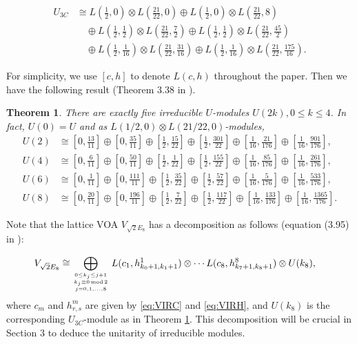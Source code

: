 \documentclass{article}
\newtheorem{theorem}[lemma]{Theorem}
\begin{document}
	\[
	\begin{split}
		U_{3C}
		& \cong  L(\frac{1}2,0)\otimes L(\frac{21}{22},0)
		\oplus L(\frac{1}{2},0)\otimes L(\frac{21}{22},8)
		\\
		& \quad \oplus  L(\frac{1}2,\frac{1}2)\otimes L(\frac{21}{22},\frac{7}{2})
		\oplus L(\frac{1}2,\frac{1}2)\otimes L(\frac{21}{22},\frac{45}{2})
		\\
		& \quad  \oplus L(\frac{1}{2},\frac{1}{16})\otimes L(\frac{21}{22},\frac{31}{16})
		\oplus L(\frac{1}{2},\frac{1}{16})\otimes L(\frac{21}{22},\frac{175}{16}).
	\end{split}
	\]
	
	For simplicity, we use $[c, h]$ to denote $L(c, h)$ throughout the paper. Then we have the following result (Theorem 3.38 in \cite{LYY}).
	\begin{theorem}\label{3cmod}
		There are exactly five irreducible $U$-modules $U(2k), 0 \le k \le
		4$. In fact, $U(0)=U$ and as $L(1/2, 0)\otimes L(21/22,0)$-modules,
		\begin{align*}
			U(2) & \cong [0,\frac{13}{11}] \oplus [0,\frac{35}{11}] \oplus
			[\frac{1}{2},\frac{15}{22}] \oplus [\frac{1}{2},\frac{301}{22}]
			\oplus [\frac{1}{16},\frac{21}{176}] \oplus [\frac{1}{16},
			\frac{901}{176}],\\
			U(4) & \cong [0,\frac{6}{11}]  \oplus [0,\frac{50}{11}] \oplus
			[\frac{1}{2},\frac{1}{22}] \oplus [\frac{1}{2},\frac{155}{22}]
			\oplus [\frac{1}{16},\frac{85}{176}] \oplus [\frac{1}{16},
			\frac{261}{176}],\\
			U(6) & \cong  [0,\frac{1}{11}] \oplus [0,\frac{111}{11}] \oplus
			[\frac{1}{2},\frac{35}{22}] \oplus [\frac{1}{2},\frac{57}{22}]
			\oplus [\frac{1}{16}, \frac{5}{176}]
			\oplus [\frac{1}{16},\frac{533}{176}],\\
			U(8) &\cong [0,\frac{20}{11}] \oplus [0,\frac{196}{11}] \oplus
			[\frac{1}{2},\frac{7}{22}] \oplus [\frac{1}{2},\frac{117}{22}]
			\oplus [\frac{1}{16},\frac{133}{176}] \oplus
			[\frac{1}{16},\frac{1365}{176}].
		\end{align*}
	\end{theorem}
	
	Note that the lattice VOA $V_{\sqrt{2}E_8}$ has a decomposition as follows (equation (3.95) in \cite{LYY}):
	
	\begin{align}\label{E8decom}
		V_{\sqrt{2}E_8} \cong
		& \bigoplus_{ { 0\leq k_j\leq j+1}
			\atop{{ k_j \equiv 0\,\mathrm{mod}\, 2} \atop{ j=0,1,\dots, 8}}}
		L(c_1,h^1_{k_{0}+1,k_1+1})\otimes \cdots  L(c_8,h^8_{k_{7}+1,k_8+1})
		\otimes U(k_8),
	\end{align}
	where $c_m$ and $h_{r,s}^m$ are given by \eqref{eq:VIRC} and
	\eqref{eq:VIRH}, and $U(k_8)$ is the corresponding $U_{3C}$-module as in Theorem \ref{3cmod}. This decomposition will be crucial in Section 3 to deduce the unitarity of irreducible modules.
	
\end{document}
